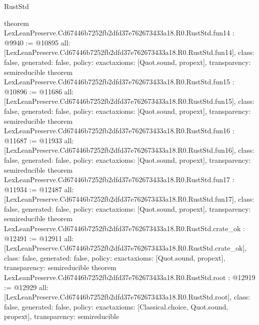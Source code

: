 \begin{lexlean}{RustStd}
\begin{coremodule}
{}
theorem LexLeanPreserve.Cd67446b7252fb2dfd37e762673433a18.R0.RustStd.fun14 : @9940 := @10895 {
  all: [LexLeanPreserve.Cd67446b7252fb2dfd37e762673433a18.R0.RustStd.fun14],
  class: false,
  generated: false,
  policy: exact{axioms: [Quot.sound, propext]},
  transparency: semireducible
}
theorem LexLeanPreserve.Cd67446b7252fb2dfd37e762673433a18.R0.RustStd.fun15 : @10896 := @11686 {
  all: [LexLeanPreserve.Cd67446b7252fb2dfd37e762673433a18.R0.RustStd.fun15],
  class: false,
  generated: false,
  policy: exact{axioms: [Quot.sound, propext]},
  transparency: semireducible
}
theorem LexLeanPreserve.Cd67446b7252fb2dfd37e762673433a18.R0.RustStd.fun16 : @11687 := @11933 {
  all: [LexLeanPreserve.Cd67446b7252fb2dfd37e762673433a18.R0.RustStd.fun16],
  class: false,
  generated: false,
  policy: exact{axioms: [Quot.sound, propext]},
  transparency: semireducible
}
theorem LexLeanPreserve.Cd67446b7252fb2dfd37e762673433a18.R0.RustStd.fun17 : @11934 := @12487 {
  all: [LexLeanPreserve.Cd67446b7252fb2dfd37e762673433a18.R0.RustStd.fun17],
  class: false,
  generated: false,
  policy: exact{axioms: [Quot.sound, propext]},
  transparency: semireducible
}
theorem LexLeanPreserve.Cd67446b7252fb2dfd37e762673433a18.R0.RustStd.crate_ok : @12491 := @12911 {
  all: [LexLeanPreserve.Cd67446b7252fb2dfd37e762673433a18.R0.RustStd.crate_ok],
  class: false,
  generated: false,
  policy: exact{axioms: [Quot.sound, propext]},
  transparency: semireducible
}
theorem LexLeanPreserve.Cd67446b7252fb2dfd37e762673433a18.R0.RustStd.root : @12919 := @12929 {
  all: [LexLeanPreserve.Cd67446b7252fb2dfd37e762673433a18.R0.RustStd.root],
  class: false,
  generated: false,
  policy: exact{axioms: [Classical.choice, Quot.sound, propext]},
  transparency: semireducible
}


\end{coremodule}
\end{lexlean}
